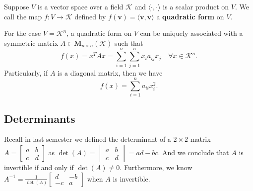 \documentclass{ctexart}
\begin{document}
    \begin{mydef}
        Suppose $V$ is a vector space over a field $\mathcal{K}$ and $\langle \cdot, \cdot \rangle$ is a scalar product on $V$. We call the map $f: V \to \mathcal{K}$ defined by $f(\mathbf{v}) = \langle \mathbf{v}, \mathbf{v} \rangle$ a \textbf{quadratic form} on $V$.
    \end{mydef}
    \begin{myex}
        For the case $V=\mathcal{K}^n$, a quadratic form on $V$ can be uniquely associated with a symmetric matrix $A\in \mathbf{M}_{n \times n}(\mathcal{K})$ such that
        \[
        f(x) = x^T A x = \sum_{i=1}^{n}\sum_{j=1}^{n} x_i a_{ij} x_j \quad \forall x \in \mathcal{K}^n.
        \]
        Particularly, if $A$ is a diagonal matrix, then we have
        \[
        f(x) = \sum_{i=1}^{n} a_{ii} x_i^2.
        \]
    \end{myex}
    
    \subsection{Determinants}
    Recall in last semester we defined the determinant of a $2\times 2$ matrix $\displaystyle A = \begin{bmatrix} a & b \\ c & d \end{bmatrix}$ as $\displaystyle \det(A) = \begin{vmatrix} a & b \\ c & d \end{vmatrix} = ad - bc$. And we conclude that $A$ is invertible if and only if $\det(A) \neq 0$. Furthermore, we know $\displaystyle A^{-1} = \frac{1}{\det(A)} \begin{bmatrix} d & -b \\ -c & a \end{bmatrix}$ when $A$ is invertible.
\end{document}
